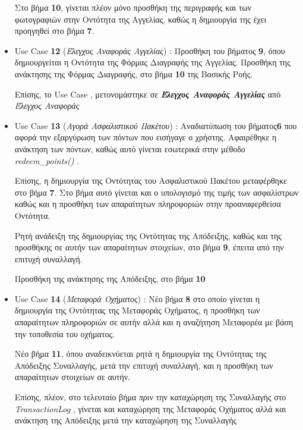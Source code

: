 \documentclass{../ol-softwaremanual}
\begin{document}
\begin{itemize}
		Στο βήμα \textbf{10}, γίνεται πλέον μόνο προσθήκη της περιγραφής και των φωτογραφιών στην Οντότητα της Αγγελίας, καθώς η δημιουργία της έχει προηγηθεί στο βήμα \textbf{7}.
		
		
		\item \en Use Case \textbf{12} \gr (\textit{Έλεγχος Αναφοράς Αγγελίας}) : Προσθήκη του βήματος \textbf{9}, όπου δημιουργείται η Οντότητα της Φόρμας Διαγραφής της Αγγελίας. Προσθήκη της ανάκτησης της Φόρμας Διαγραφής, στο βήμα \textbf{10} της Βασικής Ροής.
		
		Επίσης, το \en Use Case \gr, μετονομάστηκε σε \textbf{\textit{Έλεγχος Αναφοράς Αγγελίας}} από \textit{Έλεγχος Αναφοράς}
		
		\item \en Use Case \textbf{13} \gr (\textit{Αγορά Ασφαλιστικού Πακέτου}) : Αναδιατύπωση του βήματος\textbf{6} που αφορά την εξαργύρωση των πόντων που εισήγαγε ο χρήστης. Αφαιρέθηκε η ανάκτηση των πόντων, καθώς αυτό γίνεται εσωτερικά στην μέθοδο \en \textit{redeem\_points()} \gr. 
		
		Επίσης, η δημιουργία της Οντότητας του Ασφαλιστικού Πακέτου μεταφέρθηκε στο βήμα \textbf{7}. Στο βήμα αυτό γίνεται και ο υπολογισμό της τιμής των ασφαλίστρων καθώς και η προσθήκη των απαραίτητων πληροφοριών στην προαναφερθείσα Οντότητα. 
		
		Ρητή ανάδειξη της δημιουργίας της Οντότητας της Απόδειξης, καθώς και της προσθήκης σε αυτήν των απαραίτητων στοιχείων, στο βήμα \textbf{9}, έπειτα από την επιτυχή συναλλαγή.
		
		Προσθήκη της ανάκτησης της Απόδειξης, στο βήμα \textbf{10}
		
		\item \en Use Case \textbf{14} \gr (\textit{Μεταφορά Οχήματος}) : Νέο βήμα \textbf{8} στο οποίο γίνεται η δημιουργία της Οντότητας της Μεταφοράς Οχήματος, η προσθήκη των απαραίτητων πληροφοριών σε αυτήν αλλά και η αναζήτηση Μεταφορέα με βάση την τοποθεσία του οχήματος.
		
		Νέο βήμα \textbf{11}, όπου αναδεικνύεται ρητά η δημιουργία της Οντότητας της Απόδειξης Συναλλαγής, μετά την επιτυχή συναλλαγή, και η προσθήκη των απαραίτητων στοιχείων σε αυτήν.
		
		Επίσης, πλέον, στο τελευταίο βήμα \textit{πριν} την καταχώρηση της Συναλλαγής στο \en \textit{TransactionLog} \gr, γίνεται και καταχώρηση της Μεταφοράς Οχήματος αλλά και ανάκτηση της Απόδειξης μετά την καταχώρηση της Συναλλαγής
		
	\end{itemize}
	
\end{document}
